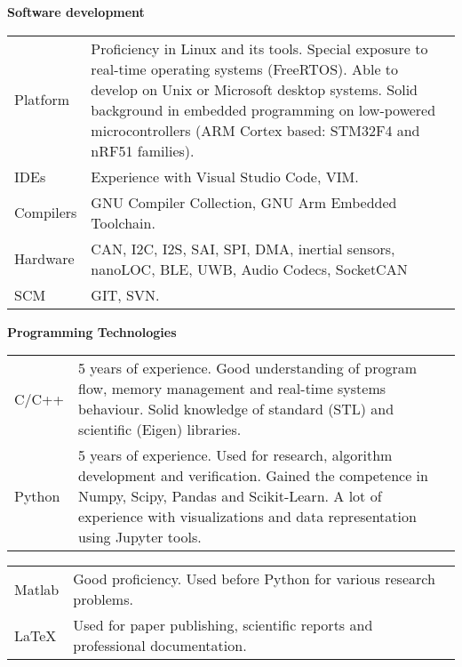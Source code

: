 \documentclass{tccv}
\begin{document}
\renewcommand{\arraystretch}{1.5}

{\large{\textbf{Software development}}}

\hspace{0cm}

\begin{tabular}{ p{1.7cm} | p{6cm} }
  Platform & Proficiency in Linux and its tools. Special exposure to real-time operating systems (FreeRTOS). Able to develop on Unix or Microsoft desktop systems. Solid background in embedded programming on low-powered microcontrollers (ARM Cortex based: STM32F4 and nRF51 families). \\
  IDEs & Experience with Visual Studio Code, VIM.  \\
  Compilers & GNU Compiler Collection, GNU Arm Embedded Toolchain.  \\
  Hardware & CAN, I2C, I2S, SAI, SPI, DMA, inertial sensors, nanoLOC, BLE, UWB, Audio Codecs, SocketCAN\\
  SCM & GIT, SVN. \\
\end{tabular}

\hspace{0cm}\newline

{\large{\textbf{Programming Technologies}}}

\hspace{0cm}

\begin{tabular}{ p{1.7cm} | p{6cm} }
  C/C++ & 5 years of experience. Good understanding of program flow, memory management and real-time systems behaviour. Solid knowledge of standard (STL) and scientific (Eigen) libraries. \\
  Python & 5 years of experience. Used for research, algorithm development and verification. Gained the competence in Numpy, Scipy, Pandas and Scikit-Learn. A lot of experience with visualizations and data representation using Jupyter tools.  \\
\end{tabular}

\begin{tabular}{ p{1.7cm} | p{6cm} }
  Matlab & Good proficiency. Used before Python for various research problems.  \\
  \LaTeX & Used for paper publishing, scientific reports and professional documentation. \\
\end{tabular}

\hspace{0cm}
\end{document}
